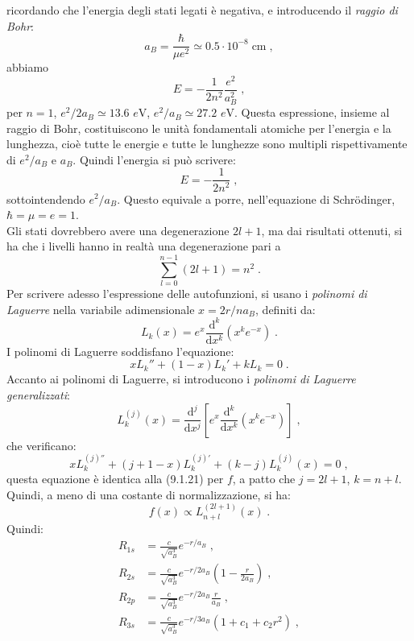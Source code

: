 \documentclass[12pt,a4paper]{report}
\theoremstyle{definition}
\numberwithin{equation}{section}
\newcommand{\diff}[1][]{\mathrm{d}#1}
\newcommand{\Sch}{Schrödinger}
\begin{document}
ricordando che l'energia degli stati legati è negativa, e introducendo il \textit{raggio di Bohr}:
\begin{equation}
a_B=\frac{\hbar}{\mu e^2}\simeq 0.5\cdot 10^{-8}\;\mathrm{cm}\;,
\end{equation}
abbiamo
\begin{equation}
E=-\frac{1}{2n^2}\frac{e^2}{a_B^2}\;,
\end{equation}
per $n=1$, $e^2/2a_B\simeq 13.6$ $e$V, $e^2/a_B\simeq 27.2$ $e$V. Questa espressione, insieme al raggio di Bohr, costituiscono le unità fondamentali atomiche per l'energia e la lunghezza, cioè tutte le energie e tutte le lunghezze sono multipli rispettivamente di $e^2/a_B$ e $a_B$. Quindi l'energia si può scrivere:
\begin{equation}
E=-\frac{1}{2n^2}\;,
\end{equation}
sottointendendo $e^2/a_B$. Questo equivale a porre, nell'equazione di \Sch , $\hbar=\mu=e=1$. \\
Gli stati dovrebbero avere una degenerazione $2l+1$, ma dai risultati ottenuti, si ha che i livelli hanno in realtà una degenerazione pari a
\begin{equation}
\sum_{l=0}^{n-1}(2l+1)=n^2\;.
\end{equation}
Per scrivere adesso l'espressione delle autofunzioni, si usano i \textit{polinomi di Laguerre} nella variabile adimensionale $x=2r/na_B$, definiti da:
\begin{equation}
L_k(x)=e^x\frac{\diff^k}{\diff{x^k}}(x^ke^{-x})\;.
\end{equation}
I polinomi di Laguerre soddisfano l'equazione:
\begin{equation}
xL_k''+(1-x)L_k'+kL_k=0\;.
\end{equation}
Accanto ai polinomi di Laguerre, si introducono i \textit{polinomi di Laguerre generalizzati}:
\begin{equation}
L_k^{(j)}(x)=\frac{\diff^j}{\diff{x^j}}\left[e^x\frac{\diff^k}{\diff{x^k}}(x^ke^{-x})\right]\;,
\end{equation}
che verificano:
\begin{equation}
xL_k^{(j)''}+(j+1-x)L_k^{(j)'}+(k-j)L_k^{(j)}(x)=0\;,
\end{equation}
questa equazione è identica alla (9.1.21) per $f$, a patto che $j=2l+1$, $k=n+l$. Quindi, a meno di una costante di normalizzazione, si ha:
\begin{equation}
f(x)\propto L_{n+l}^{(2l+1)}(x)\;.
\end{equation}
Quindi:
\begin{align*}
R_{1s}&=\frac{c}{\sqrt{a_B^3}}e^{-r/a_B}\;, \\
R_{2s}&=\frac{c}{\sqrt{a_B^3}}e^{-r/2a_B}\left(1-\frac{r}{2a_B}\right)\;, \\
R_{2p}&=\frac{c}{\sqrt{a_B^3}}e^{-r/2a_B}\frac{r}{a_B}\;, \\
R_{3s}&=\frac{c}{\sqrt{a_B^3}}e^{-r/3a_B}(1+c_1+c_2r^2)\;,
\end{align*}
\end{document}
